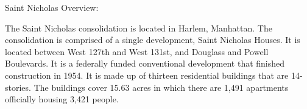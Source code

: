 Saint Nicholas Overview:  

 

The Saint Nicholas consolidation is located in Harlem, Manhattan. The consolidation is comprised of a single development, Saint Nicholas Houses. It is located between West 127th and West 131st, and Douglass and Powell Boulevards. It is a federally funded conventional development that finished construction in 1954. It is made up of thirteen residential buildings that are 14-stories. The buildings cover 15.63 acres in which there are 1,491 apartments officially housing 3,421 people.